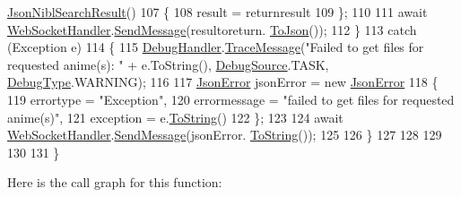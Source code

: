 \begin{DoxyCode}
      \mbox{\hyperlink{class_little_weeb_library_1_1_models_1_1_json_nibl_search_result}{JsonNiblSearchResult}}()
107                 \{
108                     result = returnresult
109                 \};
110 
111                 await \mbox{\hyperlink{class_little_weeb_library_1_1_handlers_1_1_web_socket_handler}{WebSocketHandler}}.\mbox{\hyperlink{class_little_weeb_library_1_1_handlers_1_1_web_socket_handler_a1de289d54d665a32c93478c68d3e6ad0}{SendMessage}}(resultoreturn.
      \mbox{\hyperlink{class_little_weeb_library_1_1_models_1_1_json_nibl_search_result_a0d6ce8593661ae3dab31882c85b1cff7}{ToJson}}());
112             \}
113             \textcolor{keywordflow}{catch} (Exception e)
114             \{
115                 \mbox{\hyperlink{class_little_weeb_library_1_1_handlers_1_1_debug_handler}{DebugHandler}}.\mbox{\hyperlink{class_little_weeb_library_1_1_handlers_1_1_debug_handler_afccb37dfd6b2114af72000c2f4fe4607}{TraceMessage}}(\textcolor{stringliteral}{"Failed to get files for requested
       anime(s): "} + e.ToString(), \mbox{\hyperlink{namespace_little_weeb_library_1_1_handlers_a2a6ca0775121c9c503d58aa254d292be}{DebugSource}}.TASK, \mbox{\hyperlink{namespace_little_weeb_library_1_1_handlers_ab66019ed40462876ec4e61bb3ccb0a62}{DebugType}}.WARNING);
116 
117                 \mbox{\hyperlink{class_little_weeb_library_1_1_models_1_1_json_error}{JsonError}} jsonError = \textcolor{keyword}{new} \mbox{\hyperlink{class_little_weeb_library_1_1_models_1_1_json_error}{JsonError}}
118                 \{
119                     errortype = \textcolor{stringliteral}{"Exception"},
120                     errormessage = \textcolor{stringliteral}{"failed to get files for requested anime(s)"},
121                     exception = e.\mbox{\hyperlink{class_little_weeb_library_1_1_models_1_1_json_error_ad7d5522c90119111d2e929f39e7f6d3c}{ToString}}()
122                 \};
123 
124                 await \mbox{\hyperlink{class_little_weeb_library_1_1_handlers_1_1_web_socket_handler}{WebSocketHandler}}.\mbox{\hyperlink{class_little_weeb_library_1_1_handlers_1_1_web_socket_handler_a1de289d54d665a32c93478c68d3e6ad0}{SendMessage}}(jsonError.
      \mbox{\hyperlink{class_little_weeb_library_1_1_models_1_1_json_error_ad7d5522c90119111d2e929f39e7f6d3c}{ToString}}());
125 
126             \}
127             
128 
129 
130 
131         \}
\end{DoxyCode}
Here is the call graph for this function\+:\nopagebreak
